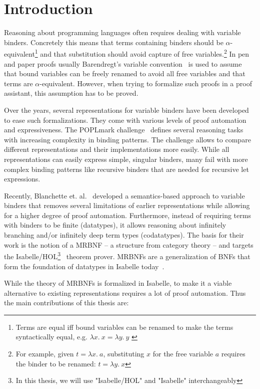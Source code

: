 \chapter{Introduction}\label{chapter:introduction}

Reasoning about programming languages often requires dealing with variable binders. Concretely this means that terms containing binders should be $\alpha$-equivalent\footnote{Terms are equal iff bound variables can be renamed to make the terms syntactically equal, e.g. $\lambda x. \: x = \lambda y. \: y$ \label{ftn:alpha-equivalence}} and that substitution should avoid capture of free variables.\footnote{For example, given $t = \lambda x. \: a$, substituting $x$ for the free variable $a$ requires the binder to be renamed: $t = \lambda y.\: x$} In pen and paper proofs usually Barendregt's variable convention~\cite{variable_convention} is used to assume that bound variables can be freely renamed to avoid all free variables and that terms are $\alpha$-equivalent. However, when trying to formalize such proofs in a proof assistant, this assumption has to be proved.

Over the years, several representations for variable binders have been developed to ease such formalizations. They come with various levels of proof automation and expressiveness. The POPLmark challenge~\cite{poplmark} defines several reasoning tasks with increasing complexity in binding patterns. The challenge allows to compare different representations and their implementations more easily. While all representations can easily express simple, singular binders, many fail with more complex binding patterns like recursive binders that are needed for recursive let expressions.

Recently, Blanchette et. al.~\cite{mrbnfs} developed a semantics-based approach to variable binders that removes several limitations of earlier representations while allowing for a higher degree of proof automation. Furthermore, instead of requiring terms with binders to be finite (datatypes), it allows reasoning about infinitely branching and/or infinitely deep term types (codatatypes). The basis for their work is the notion of a \acf{MRBNF} -- a structure from category theory -- and targets the Isabelle/HOL\footnote{In this thesis, we will use "Isabelle/HOL" and "Isabelle" interchangeably}~\cite{isabelle} theorem prover. \acp{MRBNF} are a generalization of \acp{BNF} that form the foundation of datatypes in Isabelle today~\cite{isabelle_datatypes}.

While the theory of \acp{MRBNF} is formalized in Isabelle, to make it a viable alternative to existing representations requires a lot of proof automation. Thus the main contributions of this thesis are:

